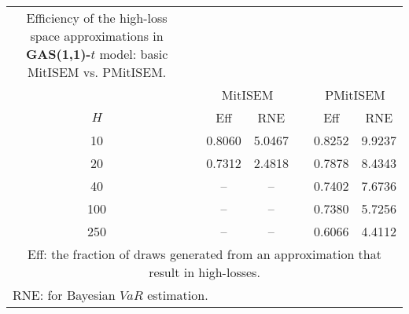 { \renewcommand{\arraystretch}{1.2} 
\begin{longtable}{cc cc c cc} 
\caption{Efficiency of the high-loss space approximations in \textbf{GAS(1,1)-$t$} model:\\ basic MitISEM vs. PMitISEM.} 
\label{tab:efft_gas} \\ 
 && \multicolumn{2}{c}{MitISEM} && \multicolumn{2}{c}{PMitISEM} \\ \cline{3-4} \cline{6-7} 
 $H$ && Eff  & RNE && Eff & RNE  \\ \cline{1-1} \cline{3-4} \cline{6-7} 
10 & &0.8060 &  5.0467 && 0.8252 &  9.9237 \\ [1ex] 
20 & &0.7312 &  2.4818 && 0.7878 &  8.4343 \\ [1ex] 
40 & &-- & -- && 0.7402 &  7.6736 \\ [1ex] 
100 & &-- & -- && 0.7380 &  5.7256 \\ [1ex] 
250 & &-- & -- && 0.6066 &  4.4112 \\ [1ex] 
\hline 
\multicolumn{7}{p{7cm}}{\footnotesize{Eff: the fraction of draws generated from an approximation that result in high-losses.}}  \\ 
\multicolumn{7}{l}{\footnotesize{RNE: for Bayesian $VaR$ estimation.}} 
\end{longtable} 
} 
\normalsize 
